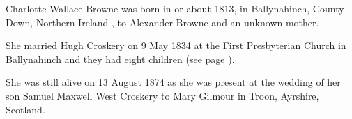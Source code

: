
Charlotte Wallace Browne was born in or about 1813, in Ballynahinch, County Down, Northern Ireland \cite{CharlotteWBrowneBirth}, to Alexander Browne and an unknown mother.

She married Hugh Croskery on 9 May 1834 at the First Presbyterian Church in Ballynahinch and they had eight children (see page \pageref{Hugh_Croskery}).

She was still alive on 13 August 1874 as she was present at the wedding of her son Samuel Maxwell West Croskery to Mary Gilmour in Troon, Ayrshire, Scotland. \cite{SMWCmarriage}
